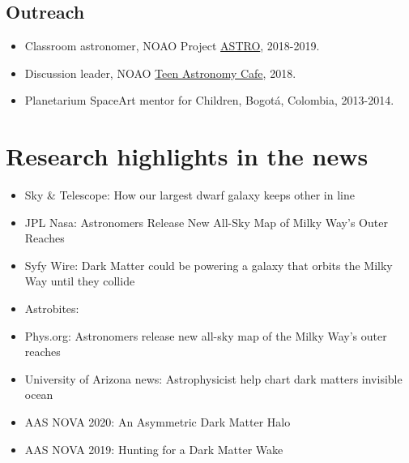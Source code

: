 \documentclass[UTF8]{article}
\begin{document}
\subsection*{Outreach}
\begin{itemize}
  \setlength\itemsep{0.0em}
  \renewcommand\labelitemi{$\cdot$}
\item Classroom astronomer, NOAO Project \href{https://www.noao.edu/education/astro/}{ASTRO}, 2018-2019.
\item Discussion leader, NOAO \href{http://www.teenastronomycafe.org/}{Teen Astronomy Cafe}, 2018.
\item Planetarium SpaceArt mentor for Children, Bogot\'a, Colombia, 2013-2014.
\end{itemize}





\section*{Research highlights in the news}

\begin{itemize}
  \setlength\itemsep{0.0em}
  \renewcommand\labelitemi{$\cdot$}
  \item Sky \& Telescope: How our largest dwarf galaxy keeps other in line
  \item JPL Nasa: Astronomers Release New All-Sky Map of Milky Way’s Outer Reaches
  \item Syfy Wire: Dark Matter could be powering a galaxy that orbits the Milky Way until they collide
  \item Astrobites: 
  \item Phys.org: Astronomers release new all-sky map of the Milky Way's outer reaches
 \item University of Arizona news: Astrophysicist help chart dark matters invisible ocean
 \item AAS NOVA 2020: An Asymmetric Dark Matter Halo
 \item AAS NOVA 2019: Hunting for a Dark Matter Wake

\end{itemize}


\end{document}
